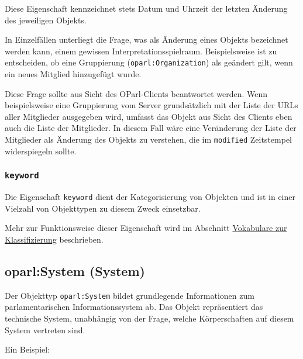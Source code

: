 \documentclass[,a4paper]{article}
\begin{document}
Diese Eigenschaft kennzeichnet stets Datum und Uhrzeit der letzten
Änderung des jeweiligen Objekts.

In Einzelfällen unterliegt die Frage, was als Änderung eines Objekts
bezeichnet werden kann, einem gewissen Interpretationsspielraum.
Beispielsweise ist zu entscheiden, ob eine Gruppierung
(\texttt{oparl:Organization}) als geändert gilt, wenn ein neues Mitglied
hinzugefügt wurde.

Diese Frage sollte aus Sicht des OParl-Clients beantwortet werden. Wenn
beispielsweise eine Gruppierung vom Server grundsätzlich mit der Liste
der URLs aller Mitglieder ausgegeben wird, umfasst das Objekt aus Sicht
des Clients eben auch die Liste der Mitglieder. In diesem Fall wäre eine
Veränderung der Liste der Mitglieder als Änderung des Objekts zu
verstehen, die im \texttt{modified} Zeitstempel widerspiegeln sollte.

\subsubsection{\texttt{keyword}}\label{keyword}

Die Eigenschaft \texttt{keyword} dient der Kategorisierung von Objekten
und ist in einer Vielzahl von Objekttypen zu diesem Zweck einsetzbar.

Mehr zur Funktionsweise dieser Eigenschaft wird im Abschnitt
\hyperref[vokabulareux5fklassifizierung]{Vokabulare zur Klassifizierung}
beschrieben.

\subsection{oparl:System (System)}\label{oparlux5fsystem}

Der Objekttyp \texttt{oparl:System} bildet grundlegende Informationen
zum parlamentarischen Informationssystem ab. Das Objekt repräsentiert
das technische System, unabhängig von der Frage, welche Körperschaften
auf diesem System vertreten sind.

Ein Beispiel:
\end{document}
